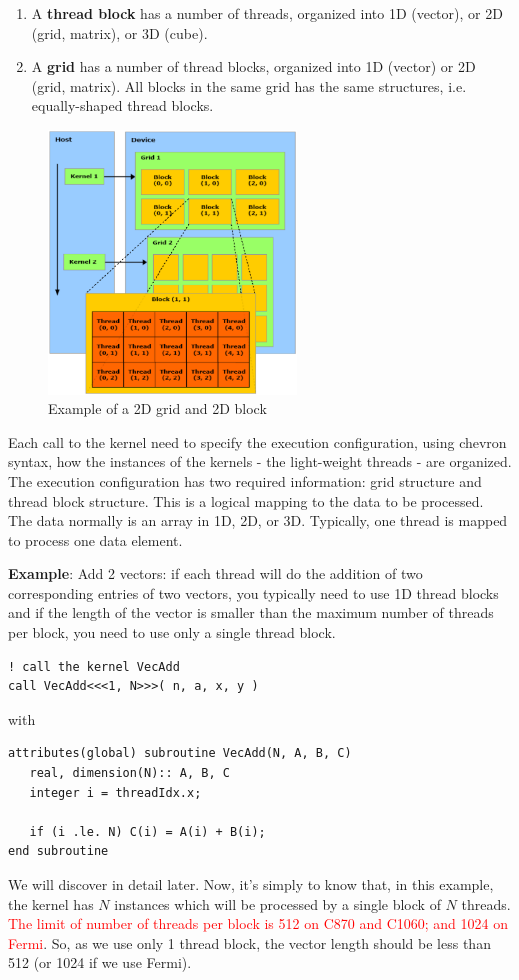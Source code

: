 \begin{enumerate}
\item A {\bf thread block} has a number of threads, organized into 1D
  (vector), or 2D (grid, matrix), or 3D (cube). 
\item A {\bf grid} has a number of thread blocks, organized into 1D
  (vector) or 2D (grid, matrix). All blocks in the same grid has the
  same structures, i.e. equally-shaped thread blocks.
\end{enumerate}
\begin{figure}[hbt]
  \centerline{\includegraphics[height=7cm,
    angle=0]{./images/cuda_grid_block2.eps}}
  \caption{Example of a 2D grid and 2D block}
  \label{fig:grid_block}
\end{figure}

Each call to the kernel need to specify the execution configuration,
using chevron syntax, how the instances of the kernels - the
light-weight threads - are organized. The execution configuration has
two required information: grid structure and thread block
structure. This is a logical mapping to the data to be processed. The
data normally is an array in 1D, 2D, or 3D. Typically, one thread is
mapped to process one data element.


{\bf Example}: Add 2 vectors: if each thread will do the addition of
two corresponding entries of two vectors, you typically need to use 1D
thread blocks and if the length of the vector is smaller than the
maximum number of threads per block, you need to use only a single
thread block.
\begin{lstlisting}
! call the kernel VecAdd
call VecAdd<<<1, N>>>( n, a, x, y )
\end{lstlisting}
with
\begin{lstlisting}
attributes(global) subroutine VecAdd(N, A, B, C)
   real, dimension(N):: A, B, C
   integer i = threadIdx.x;

   if (i .le. N) C(i) = A(i) + B(i);
end subroutine
\end{lstlisting}
We will discover in detail later. Now, it's simply to know that, in
this example, the kernel has $N$ instances which will be processed by
a single block of $N$ threads.
\textcolor{red}{The limit of number of threads per block is 512 on
  C870 and C1060; and 1024 on Fermi}.
So, as we use only 1 thread block, the vector length should be less
than 512 (or 1024 if we use Fermi).

